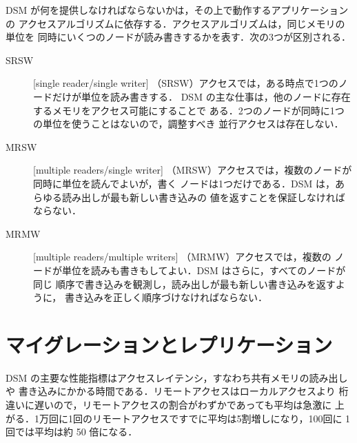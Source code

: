 \documentclass[../main.tex]{subfiles}
\begin{document}
DSM が何を提供しなければならないかは，その上で動作するアプリケーションの
アクセスアルゴリズムに依存する．アクセスアルゴリズムは，同じメモリの単位を
同時にいくつのノードが読み書きするかを表す．次の3つが区別される．
\begin{description}
  \item[SRSW] %
    [single reader/single writer]
    （SRSW）アクセスでは，ある時点で1つのノードだけが単位を読み書きする．
    DSM の主な仕事は，他のノードに存在するメモリをアクセス可能にすることで
    ある．2つのノードが同時に1つの単位を使うことはないので，調整すべき
    並行アクセスは存在しない．
  \item[MRSW] %
    [multiple readers/single writer]
    （MRSW）アクセスでは，複数のノードが同時に単位を読んでよいが，書く
    ノードは1つだけである．DSM は，あらゆる読み出しが最も新しい書き込みの
    値を返すことを保証しなければならない．
  \item[MRMW] %
    [multiple readers/multiple writers]%
    （MRMW）アクセスでは，複数の
    ノードが単位を読みも書きもしてよい．DSM はさらに，すべてのノードが同じ
    順序で書き込みを観測し，読み出しが最も新しい書き込みを返すように，
    書き込みを正しく順序づけなければならない．
\end{description}

\section{マイグレーションとレプリケーション}
\label{sec:l15-migration}

DSM の主要な性能指標はアクセスレイテンシ，すなわち共有メモリの読み出しや
書き込みにかかる時間である．リモートアクセスはローカルアクセスより
桁違いに遅いので，リモートアクセスの割合がわずかであっても平均は急激に
上がる．1万回に1回のリモートアクセスですでに平均は5割増しになり，100回に
1回では平均は約 50 倍になる．
\end{document}
